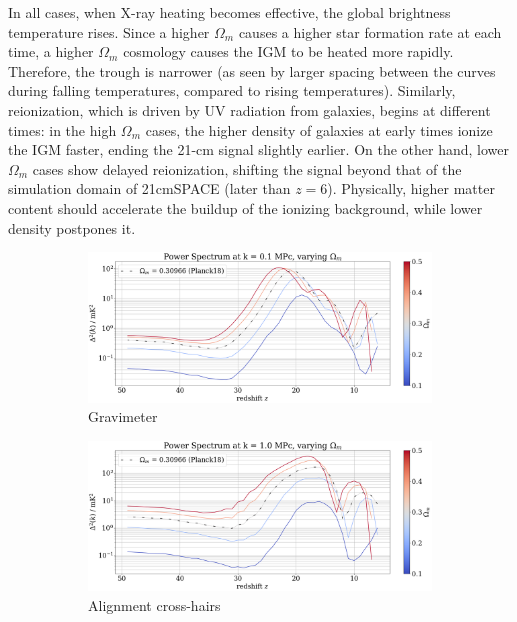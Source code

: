 \documentclass[floats,floatfix,showpacs,amssymb,prd,superscriptaddress,nofootinbib]{revtex4-2} %
\begin{document}
In all cases, when X-ray heating becomes effective, the global brightness temperature rises. Since a higher $\Omega_m$ causes a higher star formation rate at each time, a higher $\Omega_m$ cosmology causes the IGM to be heated more rapidly. Therefore, the trough is narrower (as seen by larger spacing between the curves during falling temperatures, compared to rising temperatures). Similarly, reionization, which is driven by UV radiation from galaxies, begins at different times: in the high $\Omega_m$ cases, the higher density of galaxies at early times ionize the IGM faster, ending the 21-cm signal slightly earlier. On the other hand, lower $\Omega_m$ cases show delayed reionization, shifting the signal beyond that of the simulation domain of 21cmSPACE (later than $z = 6$). Physically, higher matter content should accelerate the buildup of the ionizing background, while lower density postpones it. 

\begin{figure}[H]
     \centering
     \begin{subfigure}[b]{0.9\textwidth}
         \centering
         \includegraphics[width=\textwidth]{images/simulation_results/power_spectrum_fixed_k_0.1_Om.png}
         \caption{Gravimeter}
         \label{fig:IC_Om1}
     \end{subfigure}
     \hfill
     \begin{subfigure}[b]{0.9\textwidth}
         \centering
         \includegraphics[width=\textwidth]{images/simulation_results/power_spectrum_fixed_k_1.0_Om.png}
         \caption{Alignment cross-hairs}
         \label{fig:IC_Om5}
     \end{subfigure}
        \caption{}
        \label{fig:power_spectrum_fixed_k_Om}
\end{figure}
\end{document}
